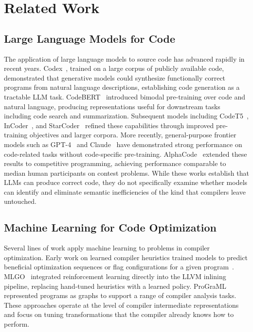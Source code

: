 \section{Related Work}

\subsection{Large Language Models for Code}

The application of large language models to source code has advanced rapidly in recent years. Codex~\cite{chen2021codex}, trained on a large corpus of publicly available code, demonstrated that generative models could synthesize functionally correct programs from natural language descriptions, establishing code generation as a tractable LLM task. CodeBERT~\cite{feng2020codebert} introduced bimodal pre-training over code and natural language, producing representations useful for downstream tasks including code search and summarization. Subsequent models including CodeT5~\cite{wang2021codet5}, InCoder~\cite{fried2022incoder}, and StarCoder~\cite{li2023starcoder} refined these capabilities through improved pre-training objectives and larger corpora. More recently, general-purpose frontier models such as GPT-4~\cite{openai2023gpt4} and Claude~\cite{anthropic2024claude} have demonstrated strong performance on code-related tasks without code-specific pre-training. AlphaCode~\cite{li2022alphacode} extended these results to competitive programming, achieving performance comparable to median human participants on contest problems. While these works establish that LLMs can produce correct code, they do not specifically examine whether models can identify and eliminate semantic inefficiencies of the kind that compilers leave untouched.

\subsection{Machine Learning for Code Optimization}

Several lines of work apply machine learning to problems in compiler optimization. Early work on learned compiler heuristics trained models to predict beneficial optimization sequences or flag configurations for a given program~\cite{ashouri2018survey}. MLGO~\cite{trofin2021mlgo} integrated reinforcement learning directly into the LLVM inlining pipeline, replacing hand-tuned heuristics with a learned policy. ProGraML~\cite{cummins2021programl} represented programs as graphs to support a range of compiler analysis tasks. These approaches operate at the level of compiler intermediate representations and focus on tuning transformations that the compiler already knows how to perform.

